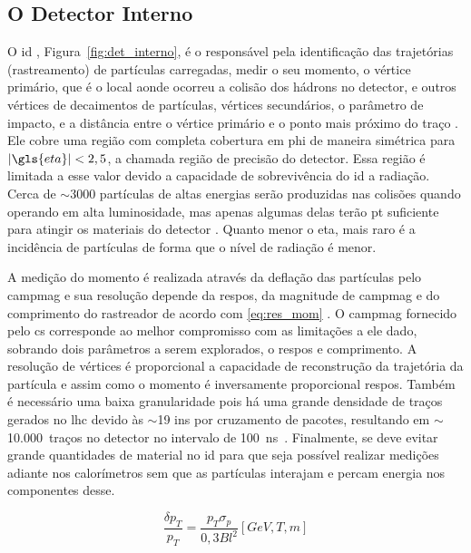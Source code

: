 \subsection{O Detector Interno}
\label{ssec:det_int}

O \gls{id} \cite{inner_tdr1,inner_tdr2}, Figura~\ref{fig:det_interno}, é o responsável pela identificação das 
trajetórias (rastreamento) de partículas carregadas, medir o seu momento, o
vértice primário, que é o local aonde ocorreu a colisão dos hádrons no detector, e outros
vértices de decaimentos de partículas, vértices secundários, o parâmetro de
impacto, e a distância entre o vértice primário e o ponto mais próximo do traço
\cite{tese_jatos,ATLAS_TDR}. Ele cobre uma região com completa cobertura em
\gls{phi} de maneira simétrica para $|\gls{eta}| < 2,5$, a chamada região de precisão
do detector. Essa região é limitada a esse valor devido 
a capacidade de sobrevivência do \gls{id} a radiação. 
Cerca de $\sim3000$ partículas de altas energias serão produzidas nas colisões
quando operando em alta luminosidade, mas apenas algumas delas terão \gls{pt}
suficiente para atingir os materiais do detector \cite{radiacao}. Quanto menor o \gls{eta},
mais raro é a incidência de partículas de forma que o nível de radiação é menor.

A medição do momento é realizada através da deflação das partículas pelo
\gls{campmag} e sua resolução depende da \gls{respos}, da magnitude de
\gls{campmag} e do \gls{comprimento} do rastreador de acordo com \ref{eq:res_mom}
\cite{lecture_slides_1,lecture_slides_2}. O \gls{campmag} fornecido pelo
\gls{cs} corresponde ao melhor compromisso com as limitações a ele dado,
sobrando dois parâmetros a serem explorados, o \gls{respos} e \gls{comprimento}. 
A resolução de vértices é proporcional a
capacidade de reconstrução da trajetória da partícula e assim como o momento
é inversamente proporcional \gls{respos}. 
Também é necessário uma baixa granularidade pois há uma grande densidade de
traços gerados no \gls{lhc} devido às  $\sim$19 \glspl{in} por cruzamento de pacotes,
resultando em $\sim$10.000~traços no detector no intervalo de 100~ns~\cite{resumo_ATLAS}.
Finalmente, se deve evitar grande quantidades de material no \gls{id} 
para que seja possível realizar medições adiante nos calorímetros sem que as partículas 
interajam e percam energia nos componentes desse.

\begin{equation}\label{eq:res_mom}
\frac{\delta p_T}{p_T} = \frac{p_T \sigma_p}{0,3Bl^2} [GeV,T,m]
\end{equation}

